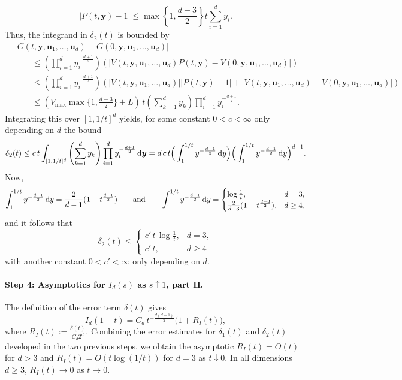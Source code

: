 \documentclass[11pt,a4paper]{article}
\theoremstyle{plain}
\theoremstyle{definition}
\theoremstyle{remark}
\newcommand{\dint}{\textup{d}}
\newcommand{\by}{\boldsymbol{y}}
\newcommand{\bu}{\boldsymbol{u}}
\begin{document}
\[
	|P(t,\by) - 1| \le \max\left\{1,\frac{d-3}{2}\right\} t \sum_{i=1}^d y_i.
\]
Thus, the integrand in $\delta_2(t)$ is bounded by
\begin{align*}
	 & |G(t,\by,\bu_1,\ldots,\bu_d) - G(0,\by,\bu_1,\ldots,\bu_d)|                                                                                  \\
	 & \qquad \leq \left(\prod_{i=1}^d y_i^{-\frac{d+1}{2}}\right) \left(|V(t,\by,\bu_1,\ldots,\bu_d)P(t,\by) - V(0,\by,\bu_1,\dotsc,\bu_d)|\right) \\
	 & \qquad \leq \left(\prod_{i=1}^d y_i^{-\frac{d+1}{2}}\right) \left(|V(t,\by,\bu_1,\ldots,\bu_d)| |P(t,\by) - 1|
	+ |V(t,\by,\bu_1,\dotsc,\bu_d)-V(0,\by,\bu_1,\dotsc,\bu_d)|\right)                                                                              \\
	 & \qquad \le (V_{\max}\max\{1,\tfrac{d-3}{2}\}+ L) \, t \left(\sum_{k=1}^d y_k\right) \prod_{i=1}^d y_i^{-\frac{d+1}{2}}.
\end{align*}
Integrating this over $[1, 1/t]^d$ yields, for some constant $0<c<\infty$ only depending on $d$ the bound
\begin{align*}
	\delta_2(t)\leq c\,t\int_{[1,1/t]^d}\left(\sum_{k=1}^d y_k\right) \prod_{i=1}^d y_i^{-\frac{d+1}{2}}\,\dint\by=d\,c\,t\Big(\int_1^{1/t}y^{-\frac{d-1}{2}}\,\dint y\Big)\Big(\int_1^{1/t}y^{-\frac{d+1}{2}}\,\dint y\Big)^{d-1}.
\end{align*}
Now,
$$
	\int_1^{1/t}y^{-\frac{d+1}{2}}\,\dint y=\frac{2}{d-1}(1-t^{\frac{d-1}{2}})\qquad\text{and}\qquad\int_1^{1/t}y^{-\frac{d-1}{2}}\,\dint y = \begin{cases}
		\log\frac{1}{t},                    & d=3,     \\
		\frac{2}{d-3}(1-t^{\frac{d-3}{2}}), & d\geq 4,
	\end{cases}
$$
and it follows that
$$
	\delta_2(t) \leq \begin{cases}
		c'\,t\,\log\frac{1}{t}, & d=3,    \\
		c'\,t,                  & d\geq 4
	\end{cases}
$$
with another constant $0<c'<\infty$ only depending on $d$.

\paragraph{Step 4: Asymptotics for $I_d(s)$ as $s\uparrow 1$, part II.}
The definition of the error term $\delta(t)$ gives
\begin{equation}\label{eq:Id_asymptotic}
	I_d(1-t)= C_d\,t^{-\frac{d(d-1)}{2}}\Big(1+R_I(t)\Big),
\end{equation}
where $R_I(t) := \frac{\delta(t)}{C_d2^d}$.
Combining the error estimates for $\delta_1(t)$ and $\delta_2(t)$ developed in the two previous steps, we obtain the asymptotic
$R_I(t) = O(t)$ for $d > 3$ and $R_I(t) = O(t \log(1/t))$ for $d=3$ as $t\downarrow 0$. In all dimensions $d \ge 3$, $R_I(t) \to 0$ as $t \to 0$.
\end{document}
